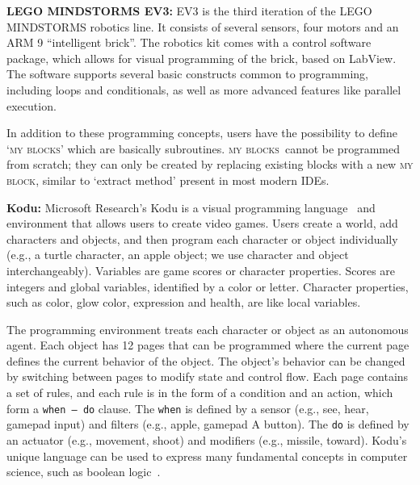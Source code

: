 \documentclass[conference]{IEEEtran}
\newcommand{\ms}{LEGO MINDSTORMS EV3}
\newcommand{\mbs}{\textsc{my blocks}}
\newcommand{\mb}{\textsc{my block}}
\begin{document}
 \textbf{\ms:}
EV3 is the third iteration of the LEGO MINDSTORMS robotics line. It consists of several sensors, four motors and an ARM 9 ``intelligent brick''. The robotics kit comes with a control software package, which allows for visual programming of the brick, based on LabView. The software supports several basic constructs common to programming, including loops and conditionals, as well as more advanced features like parallel execution. 

In addition to these programming concepts, users have the possibility to define `\mbs' which are basically  subroutines. 
\mbs~cannot be programmed from scratch; they can only be created by replacing existing blocks with a new \mb, similar to `extract method' present in most modern IDEs. 



\textbf{Kodu:}
Microsoft Research's Kodu is a visual programming language~\cite{kodugrammar} and environment that allows users to create  video games. 
Users create a world,  add characters and objects, and then  program each character or object individually (e.g., a turtle character, an apple object; we use character and object interchangeably). Variables are game scores or character properties. Scores are integers and global variables, identified by a color or letter. Character properties, such as color, glow color, expression and health, are like local variables. 

The programming environment treats each character or object as an autonomous agent. 
Each object has 12 pages that can be programmed  where the current page defines the current behavior of the object. 
The object's behavior can be changed by switching between pages to modify state and control flow. 
Each page contains a set of rules, and each rule is in the form of a condition and an action, which form a {\tt when~--~do} clause. 
The {\tt when} is defined by a sensor (e.g., see, hear, gamepad input) and filters (e.g., apple, gamepad A button). The {\tt do} is defined by an actuator (e.g., movement, shoot) and modifiers (e.g., missile, toward). 
Kodu's unique language  can be used to express many fundamental concepts in computer science, such as  boolean logic~\cite{Stolee:2011:ECS:1953163.1953197}. 
\end{document}
